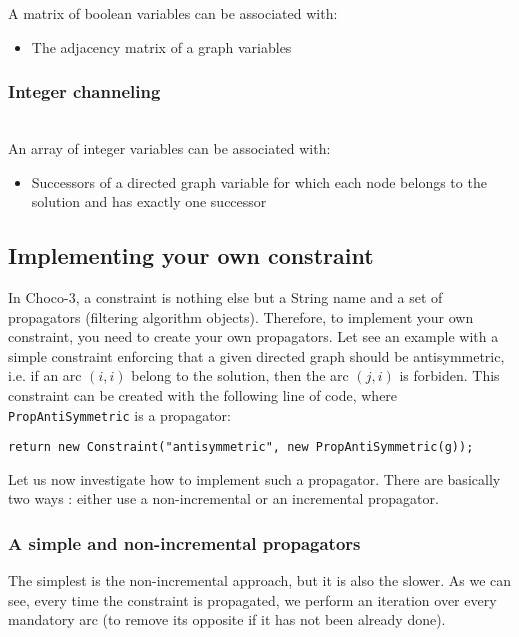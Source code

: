 \documentclass{article}
\begin{document}
A matrix of boolean variables can be associated with: 
\begin{itemize}
\item The adjacency matrix of a graph variables
\end{itemize}

\subsubsection{Integer channeling}~\\

An array of integer variables can be associated with: 
\begin{itemize}
\item Successors of a directed graph variable for which each node belongs to the solution and has exactly one successor
\end{itemize}


\subsection{Implementing your own constraint}

In Choco-3, a constraint is nothing else but a String name and a set of propagators (filtering algorithm objects). Therefore, 
to implement your own constraint, you need to create your own propagators. Let see an example with a simple constraint enforcing that a given directed graph should be antisymmetric, i.e. if an arc $(i,i)$ belong to the solution, then the arc $(j,i)$ is forbiden. This constraint can be created with the following line of code, where \texttt{PropAntiSymmetric} is a propagator:
\begin{lstlisting}
return new Constraint("antisymmetric", new PropAntiSymmetric(g));
\end{lstlisting}

Let us now investigate how to implement such a propagator. There are basically two ways : either use a non-incremental or an incremental propagator. 

\subsubsection{A simple and non-incremental propagators}

The simplest is the non-incremental approach, but it is also the slower. As we can see, every time the constraint is propagated, we perform an iteration over every mandatory arc (to remove its opposite if it has not been already done). 
\end{document}
